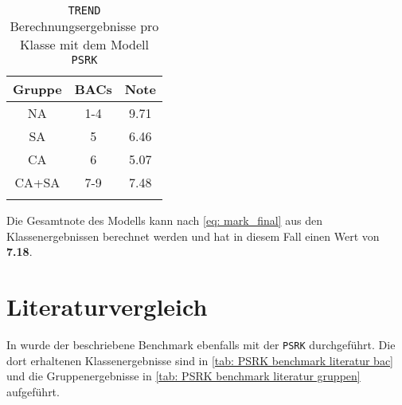 \documentclass[../thesis.tex]{subfiles}
\begin{document}
\begin{table} [htb]
	\centering
	\caption{\texttt{TREND} Berechnungsergebnisse pro Klasse mit dem Modell \texttt{PSRK}}
	\begin{tabular}{ ccc }
		\hline
		Gruppe & BACs & Note  \\
		\hline
		NA & 1-4 & 9.71 \\
		SA & 5   & 6.46 \\
		CA & 6   & 5.07 \\
		CA+SA & 7-9 & 7.48 \\ 
	
		\hline
		\label{tab: meine_gesamt_ergebnisse}
	\end{tabular}
\end{table}

Die Gesamtnote des Modells kann nach \autoref{eq: mark_final} aus den Klassenergebnissen berechnet werden und hat in diesem Fall einen Wert von \textbf{7.18}.

\section{Literaturvergleich}

In \cite{bibid} wurde der beschriebene Benchmark ebenfalls mit der \texttt{PSRK} durchgeführt. Die dort erhaltenen Klassenergebnisse sind in \autoref{tab: PSRK benchmark literatur bac} und die Gruppenergebnisse in \autoref{tab: PSRK benchmark literatur gruppen} aufgeführt.
\end{document}

